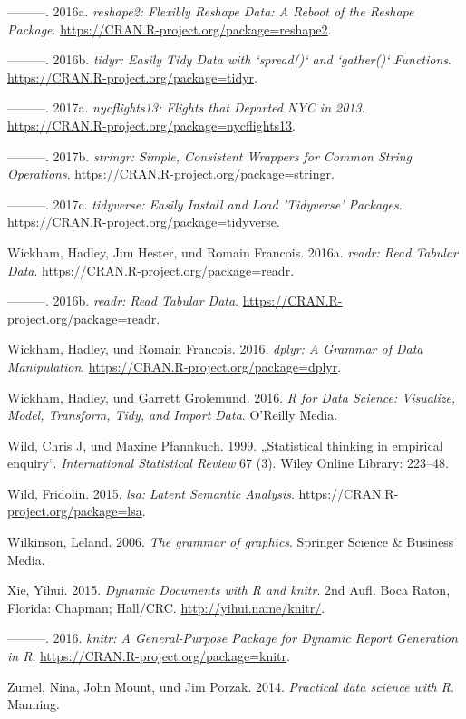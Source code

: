 \documentclass[12pt,ngerman,]{book}
\begin{document}
\hypertarget{ref-R-reshape2}{}
---------. 2016a. \emph{reshape2: Flexibly Reshape Data: A Reboot of the
Reshape Package}. \url{https://CRAN.R-project.org/package=reshape2}.

\hypertarget{ref-R-tidyr}{}
---------. 2016b. \emph{tidyr: Easily Tidy Data with `spread()` and
`gather()` Functions}. \url{https://CRAN.R-project.org/package=tidyr}.

\hypertarget{ref-R-nycflights13}{}
---------. 2017a. \emph{nycflights13: Flights that Departed NYC in
2013}. \url{https://CRAN.R-project.org/package=nycflights13}.

\hypertarget{ref-R-stringr}{}
---------. 2017b. \emph{stringr: Simple, Consistent Wrappers for Common
String Operations}. \url{https://CRAN.R-project.org/package=stringr}.

\hypertarget{ref-R-tidyverse}{}
---------. 2017c. \emph{tidyverse: Easily Install and Load 'Tidyverse'
Packages}. \url{https://CRAN.R-project.org/package=tidyverse}.

\hypertarget{ref-readr}{}
Wickham, Hadley, Jim Hester, und Romain Francois. 2016a. \emph{readr:
Read Tabular Data}. \url{https://CRAN.R-project.org/package=readr}.

\hypertarget{ref-R-readr}{}
---------. 2016b. \emph{readr: Read Tabular Data}.
\url{https://CRAN.R-project.org/package=readr}.

\hypertarget{ref-R-dplyr}{}
Wickham, Hadley, und Romain Francois. 2016. \emph{dplyr: A Grammar of
Data Manipulation}. \url{https://CRAN.R-project.org/package=dplyr}.

\hypertarget{ref-r4ds}{}
Wickham, Hadley, und Garrett Grolemund. 2016. \emph{R for Data Science:
Visualize, Model, Transform, Tidy, and Import Data}. O'Reilly Media.

\hypertarget{ref-wild1999statistical}{}
Wild, Chris J, und Maxine Pfannkuch. 1999. „Statistical thinking in
empirical enquiry``. \emph{International Statistical Review} 67 (3).
Wiley Online Library: 223--48.

\hypertarget{ref-R-lsa}{}
Wild, Fridolin. 2015. \emph{lsa: Latent Semantic Analysis}.
\url{https://CRAN.R-project.org/package=lsa}.

\hypertarget{ref-wilkinson2006grammar}{}
Wilkinson, Leland. 2006. \emph{The grammar of graphics}. Springer
Science \& Business Media.

\hypertarget{ref-xie2015}{}
Xie, Yihui. 2015. \emph{Dynamic Documents with R and knitr}. 2nd Aufl.
Boca Raton, Florida: Chapman; Hall/CRC. \url{http://yihui.name/knitr/}.

\hypertarget{ref-R-knitr}{}
---------. 2016. \emph{knitr: A General-Purpose Package for Dynamic
Report Generation in R}. \url{https://CRAN.R-project.org/package=knitr}.

\hypertarget{ref-zumel2014practical}{}
Zumel, Nina, John Mount, und Jim Porzak. 2014. \emph{Practical data
science with R}. Manning.

\printindex
\end{document}
